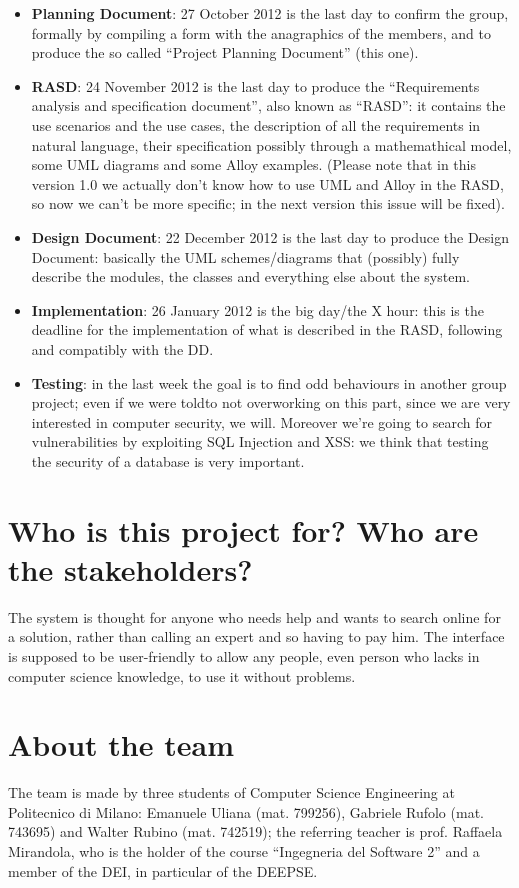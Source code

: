 \documentclass[a4paper,12pt]{article}
\begin{document}
\clearpage


\begin{itemize}
\item \textbf{Planning Document}: 27 October 2012 is the last day to confirm the group, formally by compiling a form with the anagraphics of the members, and to produce the so called “Project Planning Document” (this one).
\item \textbf{RASD}: 24 November 2012 is the last day to produce the “Requirements analysis and specification document”, also known as “RASD”: it contains the use scenarios and the use cases, the description of all the requirements in natural language, their specification possibly through a mathemathical model, some UML diagrams and some Alloy examples. (Please note that in this version 1.0 we actually don’t know how to use UML and Alloy in the RASD, so now we can’t be more specific; in the next version this issue will be fixed).
\item \textbf{Design Document}: 22 December 2012 is the last day to produce the Design Document: basically the UML schemes/diagrams that (possibly) fully describe the modules, the classes and everything else about the system.
\item \textbf{Implementation}: 26 January 2012 is the big day/the X hour: this is the deadline for the implementation of what is described in the RASD, following and compatibly with the DD.
\item \textbf{Testing}: in the last week the goal is to find odd behaviours in another group project; even if we were toldto not overworking on this part, since we are very interested in computer security, we will. Moreover we’re going to search for vulnerabilities by exploiting SQL Injection and XSS: we think that testing the security of a database is very important.
\end{itemize}

\section{Who is this project for? Who are the stakeholders?}
The system is thought for anyone who needs help and wants to search online for a solution, rather than calling an expert and so having to pay him. The interface is supposed to be user-friendly to allow any people, even person who lacks in computer science knowledge, to use it without problems.
\section{About the team}
The team is made by three students of Computer Science Engineering at Politecnico di Milano: Emanuele Uliana (mat. 799256), Gabriele Rufolo (mat. 743695) and Walter Rubino (mat. 742519); the referring teacher is prof. Raffaela Mirandola, who is the holder of the course “Ingegneria del Software 2” and a member of the DEI, in particular of the DEEPSE.
\end{document}
